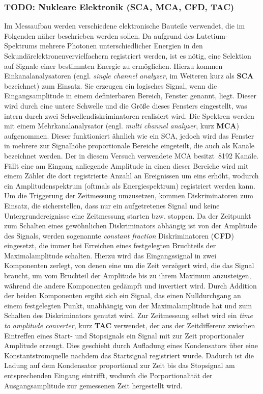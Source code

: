 \documentclass[11pt, a4paper]{article}
\numberwithin{equation}{section}
\begin{document}
\subsubsection{TODO: Nukleare Elektronik (SCA, MCA, CFD, TAC)}

Im Messaufbau werden verschiedene elektronische Bauteile verwendet, die im Folgenden näher beschrieben werden sollen.
Da aufgrund des Lutetium-Spektrums mehrere Photonen unterschiedlicher Energien in den Sekundärelektronenvervielfachern registriert werden, ist es nötig, eine Selektion auf Signale einer bestimmten Energie zu ermöglichen.
Hierzu kommen Einkanalanalysatoren (engl. \textit{single channel analyzer}, im Weiteren kurz als \textbf{SCA} bezeichnet) zum Einsatz.
Sie erzeugen ein logisches Signal, wenn die Eingangsamplitude in einem definierbaren Bereich, Fenster genannt, liegt.
Dieser wird durch eine untere Schwelle und die Größe dieses Fensters eingestellt, was intern durch zwei Schwellendiskriminatoren realisiert wird.
Die Spektren werden mit einem Mehrkanalanalysator (engl. \textit{multi channel analyzer}, kurz \textbf{MCA}) aufgenommen.
Dieser funktioniert ähnlich wie ein SCA, jedoch wird das Fenster in mehrere zur Signalhöhe proportionale Bereiche eingeteilt, die auch als Kanäle bezeichnet werden.
Der in diesem Versuch verwendete MCA besitzt~\num{8192} Kanäle.
Fällt eine am Eingang anliegende Amplitude in einen dieser Bereiche wird mit einem Zähler die dort registrierte Anzahl an Ereignissen um eins erhöht, wodurch ein Amplitudenspektrum (oftmals als Energiespektrum) registriert werden kann.
Um die Triggerung der Zeitmessung umzusetzen, kommen Diskriminatoren zum Einsatz, die sicherstellen, dass nur ein aufgetretenes Signal und keine Untergrundereignisse eine Zeitmessung starten bzw. stoppen.
Da der Zeitpunkt zum Schalten eines gewöhnlichen Diskriminators abhängig ist von der Amplitude des Signals, werden sogenannte \textit{constant fraction} Diskriminatoren (\textbf{CFD}) eingesetzt, die immer bei Erreichen eines festgelegten Bruchteils der Maximalamplitude schalten.
Hierzu wird das Eingangssignal in zwei Komponenten zerlegt, von denen eine um die Zeit verzögert wird, die das Signal braucht, um vom Bruchteil der Amplitude bis zu ihrem Maximum anzusteigen, während die andere Komponenten gedämpft und invertiert wird.
Durch Addition der beiden Komponenten ergibt sich ein Signal, das einen Nulldurchgang an einem festgelegten Punkt, unabhängig von der Maximalamplitude hat und zum Schalten des Diskriminators  genutzt wird.
Zur Zeitmessung selbst wird ein \textit{time to amplitude converter}, kurz \textbf{TAC} verwendet, der aus der Zeitdifferenz zwischen Eintreffen eines Start- und Stopsignals ein Signal mit zur Zeit proportionaler Amplitude erzeugt.
Dies geschieht durch Aufladung eines Kondensators über eine Konstantstromquelle nachdem das Startsignal registriert wurde.
Dadurch ist die Ladung auf dem Kondensator proportional zur Zeit bis das Stopsignal am entsprechenden Eingang eintrifft, wodurch die Porportionalität der Ausgangsamplitude zur gemessenen Zeit hergestellt wird. 
\end{document}
